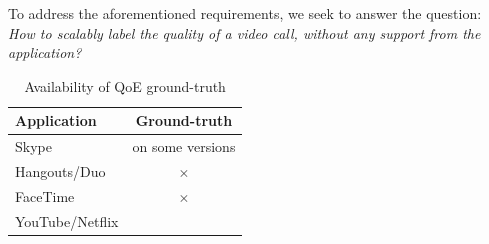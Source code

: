 To address the aforementioned requirements, we seek to answer the question: {\em How to scalably label the quality of a video call, without any support from the application?}

\begin{table}[t]
	\centering
		\scriptsize
			\vspace*{-0.5em}	
			\begin{tabular}{l|c}
				\hline \hline
				\textbf{Application} & \textbf{Ground-truth} \\
				\hline
				\hline
				Skype & \checkmark *on some versions \\  \hline
				Hangouts/Duo & $\times$ \\ \hline
				FaceTime & $\times$ \\ \hline
				YouTube/Netflix & \checkmark \\ \hline 
			\end{tabular} 
        \vspace*{0.2em}
		\hfill 
		\caption{Availability of QoE ground-truth}
		\label{tab:table1} 
\end{table}
